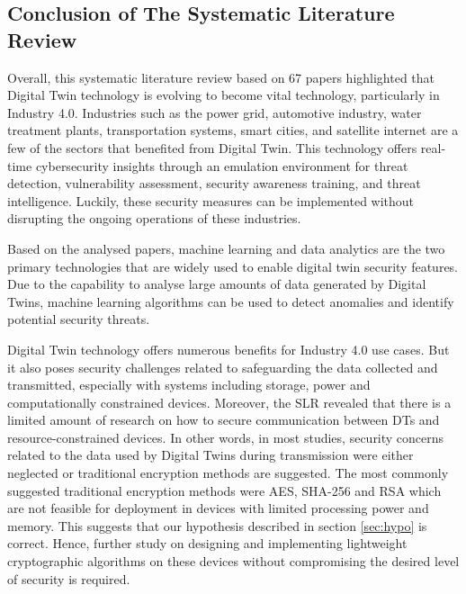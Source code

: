 \subsection{Conclusion of The Systematic Literature Review}
Overall, this systematic literature review based on 67 papers highlighted that Digital Twin technology is evolving to become vital technology, particularly in Industry 4.0. Industries such as the power grid, automotive industry, water treatment plants, transportation systems, smart cities, and satellite internet are a few of the sectors that benefited from Digital Twin. This technology offers real-time cybersecurity insights through an emulation environment for threat detection, vulnerability assessment, security awareness training, and threat intelligence. Luckily, these security measures can be implemented without disrupting the ongoing operations of these industries. 



Based on the analysed papers, machine learning and data analytics are the two primary technologies that are widely used to enable digital twin security features. Due to the capability to analyse large amounts of data generated by Digital Twins, machine learning algorithms can be used to detect anomalies and identify potential security threats.

Digital Twin technology offers numerous benefits for Industry 4.0 use cases. But it also poses security challenges related to safeguarding the data collected and transmitted, especially with systems including storage, power and computationally constrained devices. Moreover, the SLR revealed that there is a limited amount of research on how to secure communication between DTs and resource-constrained devices. In other words, in most studies, security concerns related to the data used by Digital Twins during transmission were either neglected or traditional encryption methods are suggested. The most commonly suggested traditional encryption methods were AES, SHA-256 and RSA which are not feasible for deployment in devices with limited processing power and memory. This suggests that our hypothesis described in section \ref{sec:hypo} is correct. Hence, further study on designing and implementing lightweight cryptographic algorithms on these devices without compromising the desired level of security is required. 

